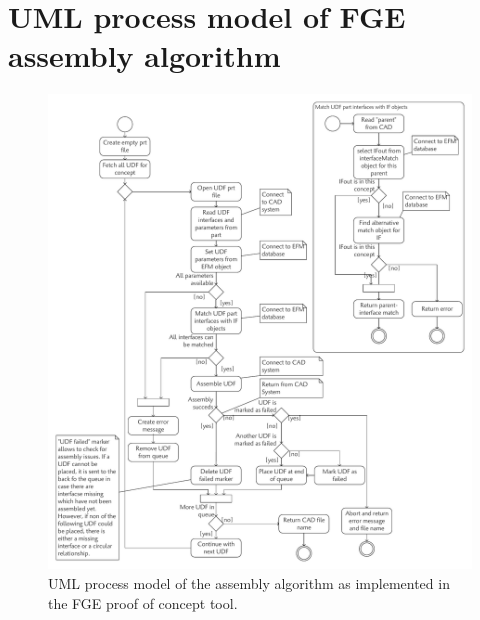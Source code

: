 \documentclass[aerospace,article,submit,moreauthors,pdftex]{Definitions/mdpi}
\begin{document}
\section{UML process model of FGE assembly algorithm}\label{app:umlAssembly}
\begin{figure}[!h]
    \centering
    \includegraphics[width=\textwidth]{figures/pdf/assemblyAlgorithm.pdf}
    \caption{UML process model of the assembly algorithm as implemented in the FGE proof of concept tool.}
    \label{fig:assemblyAlgorithm}
\end{figure}
\end{document}
